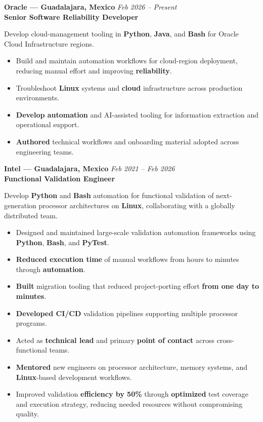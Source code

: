 \documentclass[10.5pt,a4paper]{article}
\newcommand{\entryheader}[3]{%
  {\large\bfseries\color{darkgray} #1} \hfill {\small\color{midgray}\itshape #3}\\[1pt]
  {\bfseries\color{accent2} #2}\par\vspace{2pt}
}
\begin{document}
\entryheader{Oracle --- Guadalajara, Mexico}{Senior Software Reliability Developer}{Feb 2026 -- Present}
Develop cloud-management tooling in \textbf{Python}, \textbf{Java}, and \textbf{Bash} for Oracle Cloud Infrastructure regions.
\begin{itemize}
  \item Build and maintain automation workflows for cloud-region deployment, reducing manual effort and improving \textbf{reliability}. \\
  \item Troubleshoot \textbf{Linux} systems and \textbf{cloud} infrastructure across production environments. \\
  \item \textbf{Develop automation} and AI-assisted tooling for information extraction and operational support. \\
  \item \textbf{Authored} technical workflows and onboarding material adopted across engineering teams. \\
\end{itemize}

\entryheader{Intel --- Guadalajara, Mexico}{Functional Validation Engineer}{Feb 2021 -- Feb 2026}
Develop \textbf{Python} and \textbf{Bash} automation for functional validation of next-generation processor architectures on \textbf{Linux}, collaborating with a globally distributed team.
\begin{itemize}
  \item Designed and maintained large-scale validation automation frameworks using \textbf{Python}, \textbf{Bash}, and \textbf{PyTest}. \\
  \item \textbf{Reduced execution time} of manual workflows from hours to minutes through \textbf{automation}. \\
  \item \textbf{Built} migration tooling that reduced project-porting effort \textbf{from one day to minutes}. \\
  \item \textbf{Developed CI/CD} validation pipelines supporting multiple processor programs. \\
  \item Acted as \textbf{technical lead} and primary \textbf{point of contact} across cross-functional teams. \\
  \item \textbf{Mentored} new engineers on processor architecture, memory systems, and \textbf{Linux}-based development workflows. \\
  \item Improved validation \textbf{efficiency by 50\%} through \textbf{optimized} test coverage and execution strategy, reducing needed resources without compromising quality. \\
\end{itemize}
\end{document}
